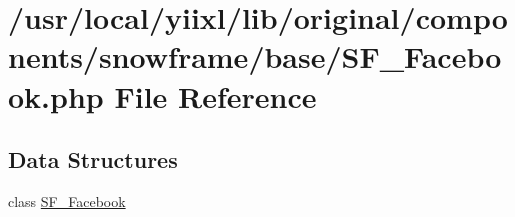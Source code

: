 \hypertarget{SF__Facebook_8php}{
\section{/usr/local/yiixl/lib/original/components/snowframe/base/SF\_\-Facebook.php File Reference}
\label{SF__Facebook_8php}
}
\subsection*{Data Structures}
\begin{DoxyCompactItemize}
\item 
class \hyperlink{classSF__Facebook}{SF\_\-Facebook}
\end{DoxyCompactItemize}

